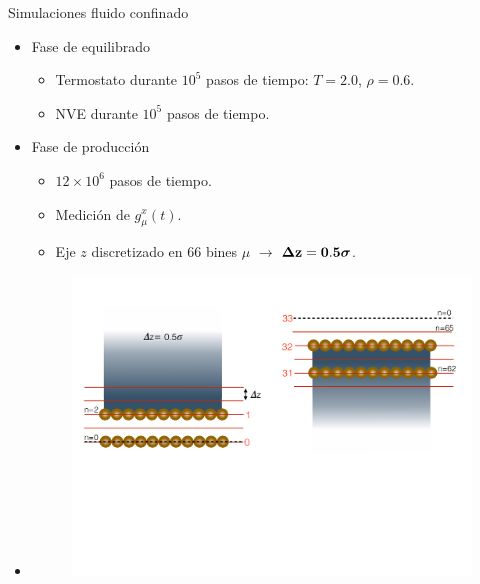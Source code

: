 \documentclass{beamer}
\begin{document}
\begin{frame}{Simulaciones fluido confinado}
   \begin{itemize}
     \item Fase de \alert{equilibrado}
       \begin{itemize}
         \item Termostato durante $10^5$ pasos de tiempo: $T=2.0$, $\rho=0.6$.
         \item NVE durante $10^5$ pasos de tiempo.
          \end{itemize}
        \item Fase de \alert{producción}
       \begin{itemize}
         \item $12\times10^6$ pasos de tiempo.
         \item Medición de $g_{\mu}^x(t)$.
         \item Eje $z$ discretizado en $66$ bines $\mu$ $\rightarrow$ {$\boldsymbol{\Delta} {\bf z=0.5}\boldsymbol{\sigma}$}.
         \end{itemize}
       \item[]
         \begin{figure}
    \includegraphics[width=\linewidth]{bin_size_top-bottom}
  \end{figure}
     \end{itemize}

 \end{frame}
\end{document}
